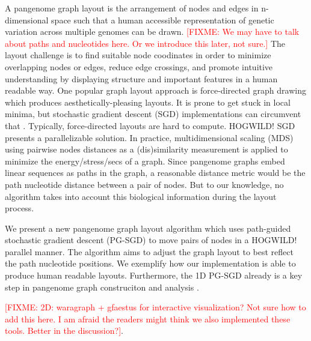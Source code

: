 \documentclass{bioinfo}
\theoremstyle{definition}
\newcommand{\red}[1]{{\textcolor{Red}{#1}}}
\newcommand{\FIXME}[1]{\red{[FIXME: #1]}}
\begin{document}
A pangenome graph layout is the arrangement of nodes and edges in n-dimensional space such that a human accessible representation of genetic variation across multiple genomes can be drawn. 
\FIXME{We may have to talk about paths and nucleotides here. Or we introduce this later, not sure.}
The layout challenge is to find suitable node coodinates in order to minimize overlapping nodes or edges, reduce edge crossings, and promote intuitive understanding by displaying structure and important features in a human readable way. 
One popular graph layout approach is force-directed graph drawing which produces aesthetically-pleasing layouts. It is prone to get stuck in local minima, but stochastic gradient descent (SGD) implementations can circumvent that \citep{Zheng2019}. Typically, force-directed layouts are hard to compute. HOGWILD! \citep{Recht2011} SGD presents a parallelizable solution. In practice, multidimensional scaling (MDS) using pairwise nodes distances as a (dis)similarity measurement is applied to minimize the energy/stress/secs of a graph.
Since pangenome graphs embed linear sequences as paths in the graph, a reasonable distance metric would be the path nucleotide distance between a pair of nodes. 
But to our knowledge, no algorithm takes into account this biological information during the layout process.

We present a new pangenome graph layout algorithm which uses path-guided stochastic gradient descent %
(PG-SGD) to move pairs of nodes in a HOGWILD! parallel manner. The algorithm aims to adjust the graph layout to best reflect the path nucleotide positions.
We exemplify how our implementation is able to produce human readable layouts. Furthermore, the 1D PG-SGD already is a key step in pangenome graph construciton \citep{Liao2023, Garrison2023} and analysis \citep{Guarracino2022, Guarracino2023}.

\FIXME{2D: waragraph + gfaestus for interactive visualization? Not sure how to add this here. I am afraid the readers might think we also implemented these tools. Better in the discussion?}. \\

\end{document}
